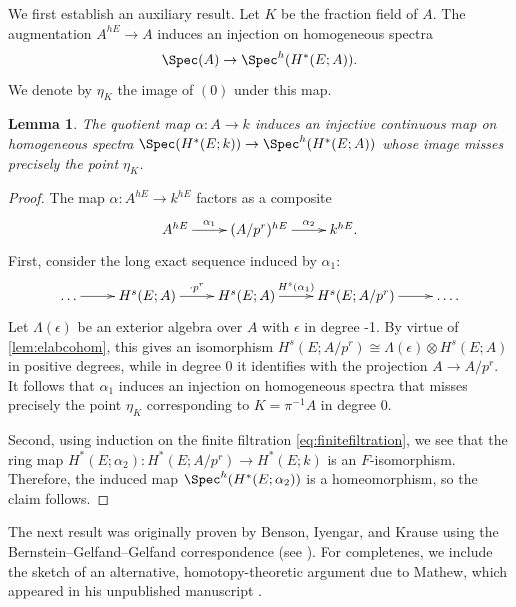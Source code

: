 \documentclass{amsart}%
\numberwithin{equation}{section}%
\newtheorem{Lem}[equation]{Lemma}
\theoremstyle{remark}
\begin{document}
We first establish an auxiliary result. Let $K$ be the fraction field of $A$. The augmentation $A^{hE} \to A$ induces an injection on homogeneous spectra
\[
\Spec(A) \to \Spec^h(H^*(E;A)).
\]
We denote by $\eta_{K}$ the image of $(0)$ under this map.

\begin{Lem}\label{lem:quotmapelabcohom}
The quotient map $\alpha\colon A \to k$ induces an injective continuous map on homogeneous spectra $\Spec(H^*(E;k)) \to \Spec^h(H^*(E;A))$
whose image misses precisely the point $\eta_{K}$.
\end{Lem}
\begin{proof}
The map $\alpha\colon A^{hE} \to k^{hE}$ factors as a composite
\[
\xymatrix{A^{hE} \ar[r]^-{\alpha_1} & (A/p^r)^{hE} \ar[r]^-{\alpha_2} & k^{hE}.}
\]
First, consider the long exact sequence induced by $\alpha_1$:
\[
\xymatrix{\ldots \ar[r] & H^s(E;A) \ar[r]^-{\cdot p^r} & H^s(E;A) \ar[r]^-{H^s(\alpha_1)} & H^s(E;A/p^r) \ar[r] & \ldots.}
\]
Let $\Lambda(\epsilon)$ be an exterior algebra over $A$ with $\epsilon$ in degree -1. By virtue of \cref{lem:elabcohom}, this gives an isomorphism $H^s(E;A/p^r) \cong \Lambda(\epsilon) \otimes H^s(E;A)$ in positive degrees, while in degree $0$ it identifies with the projection $A \to A/p^r$. It follows that $\alpha_1$ induces an injection on homogeneous spectra that misses precisely the point $\eta_{K}$ corresponding to $K=\pi^{-1}A$ in degree 0. 

Second, using induction on the finite filtration \eqref{eq:finitefiltration}, we see that the ring map $H^*(E;\alpha_2)\colon H^*(E;A/p^r) \to H^*(E;k)$ is an $F$-isomorphism. Therefore, the induced map $\Spec^h(H^*(E;\alpha_2))$ is a homeomorphism, so the claim follows.
\end{proof}

The next result was originally proven by Benson, Iyengar, and Krause \cite[Thm.~8.1]{BensonIyengarKrause11a} using the Bernstein--Gelfand--Gelfand correspondence (see \cite{abim_bgg}). For completenes, we include the sketch of an alternative, homotopy-theoretic argument due to Mathew, which appeared in his unpublished manuscript \cite{mathew_torus}.
\end{document}
